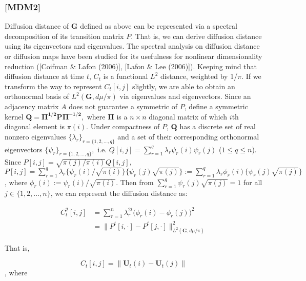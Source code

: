 \documentclass[12pt]{article}
\theoremstyle{definition}
\begin{document}
\subsubsection{[MDM2]}

Diffusion distance of $\boldsymbol{G}$ defined as above can be represented via a spectral decomposition of its transition matrix $P$. That is, we can derive diffusion distance using its eigenvectors and eigenvalues. The spectral analysis on diffusion distance or diffusion maps have been studied for its usefulness for nonlinear dimensionality reduction ([Coifman $\&$ Lafon (2006)], [Lafon $\&$ Lee (2006)]). 
Keeping mind that diffusion distance at time $t$, $C_{t}$ is a functional $L^2$ distance, weighted by 1/$\pi$. If we transform the way to represent $C_{t}[i,j]$ slightly, we are able to obtain an orthonormal basis of $L^{2}(\mathbf{G}, d\mu / \pi)$ via eigenvalues and eigenvectors. 
Since an adjacency matrix $A$ does not guarantee a symmetric of $P$, define a symmetric kernel $\boldsymbol{Q} = \boldsymbol{\Pi^{1/2} P \Pi^{-1/2}},$ where $\mathbf{\Pi}$ is a $n \times n$ diagonal matrix of which $i$th diagonal element is $\pi(i)$. Under compactness of $P$, $\boldsymbol{Q}$ has a discrete set of real nonzero eigenvalues $\{ \lambda_{r} \}_{r = \{1,2,...,q \}}$ and a set of their corresponding orthonormal eigenvectors $\{ \psi_{r} \}_{r = \{1,2,..., q \} },$ i.e. $Q[i,j] = \sum\limits_{r=1}^{q} \lambda_{r} \psi_{r}(i) \psi_{r}(j)$ ($1 \leq q \leq n$).  
 Since $P[i,j] = \sqrt{\pi(j) / \pi(i) } Q[i,j]$, $P[i,j]= \sum\limits_{r=1}^{q} \lambda_{r} \{ \psi_{r}(i) / \sqrt{\pi(i)}  \} \{ \psi_{r}(j) \sqrt{\pi(j)} \} := \sum\limits_{r=1}^{q} \lambda_{r} \phi_{r}(i) \{ \psi_{r}(j) \sqrt{\pi(j)} \}$, where $\phi_{r}(i) := \psi_{r}(i) / \sqrt{\pi(i)}$. Then from $\sum\limits_{r=1}^{q} \psi_{r}(j) \sqrt{\pi(j)} = 1$ for all $j \in \{1,2,...,n\}$, 
 we can represent the diffusion distance as: 
 
 \begin{equation}
 \begin{split}
 C^2_{t}[i,j] & = \sum\limits_{r=1}^{n} \lambda^{2t}_{r} \big( \phi_{r} (i) - \phi_{r}(j)   \big)^2   \\ &  = \parallel P^{t}[i, \cdot] - P^{t}[j, \cdot]  \parallel^2_{L^{2}(\boldsymbol{G}, d\mu / \pi)  }
 \end{split}
 \end{equation}
 
 That is,
 
 \begin{equation}
 C_{t}[i,j] = \parallel \boldsymbol{U}_{t}(i) - \boldsymbol{U}_{t}(j) \parallel
 \end{equation}
 , where 
\end{document}
